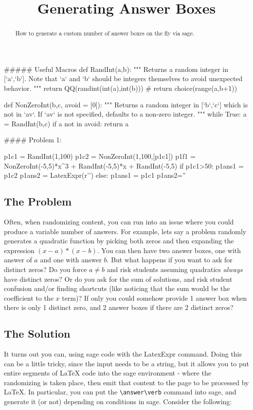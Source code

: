 \documentclass{ximera}
\title{Generating Answer Boxes}
\begin{document}
\begin{abstract}
    How to generate a custom number of answer boxes on the fly via sage.
\end{abstract}
\maketitle


\begin{sagesilent}
##### Useful Macros
def RandInt(a,b):
    """ Returns a random integer in [`a`,`b`]. Note that `a` and `b` should be integers themselves to avoid unexpected behavior.
    """
    return QQ(randint(int(a),int(b)))
    # return choice(range(a,b+1))

def NonZeroInt(b,c, avoid = [0]):
    """ Returns a random integer in [`b`,`c`] which is not in `av`. 
        If `av` is not specified, defaults to a non-zero integer.
    """
    while True:
        a = RandInt(b,c)
        if a not in avoid:
            return a

#### Problem 1:

p1c1 = RandInt(1,100)
p1c2 = NonZeroInt(1,100,[p1c1])
p1f1 = NonZeroInt(-5,5)*x^3 + RandInt(-5,5)*x + RandInt(-5,5)
if p1c1>50:
    p1ans1 = p1c2
    p1ans2 = LatexExpr(r'')
else:
    p1ans1 = p1c1
    p1ans2=''
    



\end{sagesilent}
   
   
\subsection*{The Problem}
     Often, when randomizing content, you can run into an issue where you could produce a variable number of answers. For example, lets say a problem randomly generates a quadratic function by picking both zeros and then expanding the expression $(x-a)*(x-b)$. You can then have two answer boxes, one with answer of $a$ and one with answer $b$. But what happens if you want to ask for distinct zeros? Do you force $a \neq b$ and risk students assuming quadratics \textit{always} have distinct zeros? Or do you ask for the sum of solutions, and risk student confusion and/or finding shortcuts (like noticing that the sum would be the coefficient to the $x$ term)? If only you could somehow provide 1 answer box when there is only 1 distinct zero, and 2 answer boxes if there are 2 distinct zeros?
    
\subsection*{The Solution}
    It turns out you can, using sage code with the LatexExpr command. Doing this can be a little tricky, since the input needs to be a string, but it allows you to put entire segments of LaTeX code into the sage environment - where the randomizing is taken place, then emit that content to the page to be processed by LaTeX. In particular, you can put the \verb|\answer\verb| command into sage, and generate it (or not) depending on conditions in sage. Consider the following:
\end{document}

